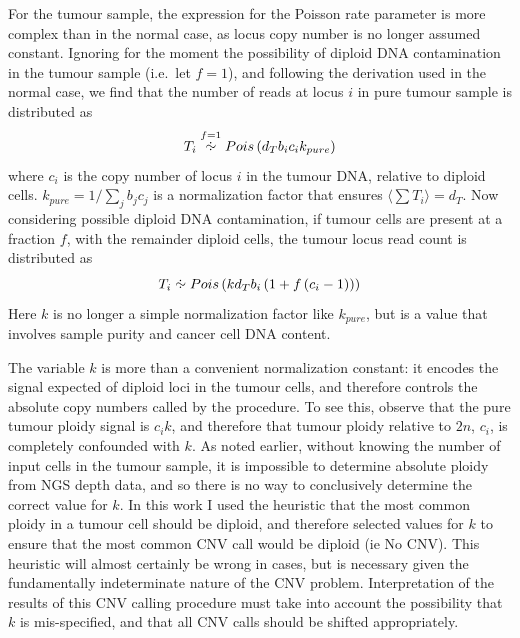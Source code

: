 \documentclass[thesis.tex]{subfiles}
\begin{document}
For the tumour sample, the expression for the Poisson rate parameter is more complex than in the normal case, as locus copy number is no longer assumed constant.  Ignoring for the moment the possibility of diploid DNA contamination in the tumour sample (i.e.\ let $f = 1$), and following the derivation used in the normal case, we find that the number of reads at locus $i$ in pure tumour sample is distributed as
\begin{equation}
  T_i \overset{f = 1}{\approxdist} Pois\left(d_T b_i c_i k_{pure} \right)
  \label{eq:comp_cnv_Tpois_pure}
\end{equation}
where $c_i$ is the copy number of locus $i$ in the tumour DNA, relative to diploid cells.  $k_{pure} = 1/\sum_{j} b_j c_j$ is a normalization factor that ensures $\langle \sum T_i \rangle = d_T$.  Now considering possible diploid DNA contamination, if tumour cells are present at a fraction $f$, with the remainder diploid cells, the tumour locus read count is distributed as
\begin{equation}
  T_i \approxdist Pois\left(k d_T b_i \left( 1 + f \left(c_i - 1\right) \right) \right)
\label{eq:comp_cnv_Tpois_g}
\end{equation}
Here $k$ is no longer a simple normalization factor like $k_{pure}$, but is a value that involves sample purity and cancer cell DNA content.  

The variable $k$ is more than a convenient normalization constant: it encodes the signal expected of diploid loci in the tumour cells, and therefore controls the absolute copy numbers called by the procedure.  To see this, observe that the pure tumour ploidy signal is $c_i k$, and therefore that tumour ploidy relative to $2n$, $c_i$, is completely confounded with $k$.  As noted earlier, without knowing the number of input cells in the tumour sample, it is impossible to determine absolute ploidy from \gls{NGS} depth data, and so there is no way to conclusively determine the correct value for $k$.  In this work I used the heuristic that the most common ploidy in a tumour cell should be diploid, and therefore selected values for $k$ to ensure that the most common \gls{CNV} call would be diploid (ie No CNV).  This heuristic will almost certainly be wrong in cases, but is necessary given the fundamentally indeterminate nature of the \gls{CNV} problem.  Interpretation of the results of this \gls{CNV} calling procedure must take into account the possibility that $k$ is mis-specified, and that all CNV calls should be shifted appropriately.
\end{document}
